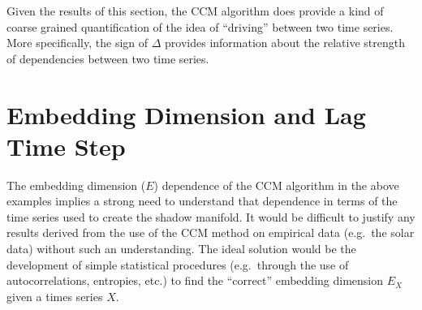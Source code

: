 \documentclass[a4paper,11pt]{article}
\begin{document}
Given the results of this section, the CCM algorithm does provide a kind of coarse grained quantification of the idea of ``driving'' between two time series.  More specifically, the sign of $\Delta$ provides information about the relative strength of dependencies between two time series.

\section{Embedding Dimension and Lag Time Step}
The embedding dimension ($E$) dependence of the CCM algorithm in the above examples implies a strong need to understand that dependence in terms of the time series used to create the shadow manifold.  It would be difficult to justify any results derived from the use of the CCM method on empirical data (e.g.\ the solar data) without such an understanding.  The ideal solution would be the development of simple statistical procedures (e.g.\ through the use of autocorrelations, entropies, etc$.$) to find the ``correct'' embedding dimension $E_X$ given a times series $X$.
\end{document}
